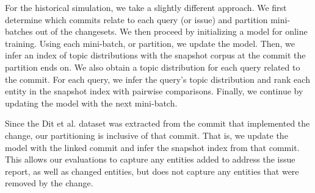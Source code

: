 For the historical simulation, we take a slightly different approach. We first
determine which commits relate to each query (or issue) and partition
mini-batches out of the changesets.  We then proceed by initializing a model for
online training. Using each mini-batch, or partition, we update the model.
Then, we infer an index of topic distributions with the snapshot corpus at the
commit the partition ends on.  We also obtain a topic distribution for each
query related to the commit.  For each query, we infer the query's topic
distribution and rank each entity in the snapshot index with pairwise
comparisons.  Finally, we continue by updating the model with the next
mini-batch.

Since the Dit et al. dataset was extracted from the commit that implemented the
change, our partitioning is inclusive of that commit.  That is, we update the
model with the linked commit and infer the snapshot index from that commit.
This allows our evaluations to capture any entities added to address the issue
report, as well as changed entities, but does not capture any entities that were
removed by the change.





